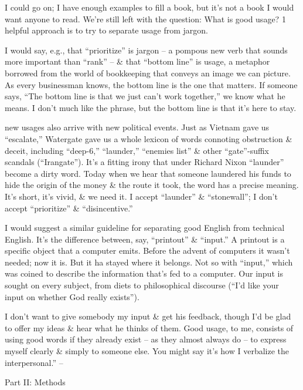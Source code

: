 \documentclass{article}
\begin{document}
I could go on; I have enough examples to fill a book, but it's not a book I would want anyone to read. We're still left with the question: What is good usage? 1 helpful approach is to try to separate usage from jargon.

I would say, e.g., that ``prioritize'' is jargon -- a pompous new verb that sounds more important than ``rank'' -- \& that ``bottom line'' is usage, a metaphor borrowed from the world of bookkeeping that conveys an image we can picture. As every businessman knows, the bottom line is the one that matters. If someone says, ``The bottom line is that we just can't work together,'' we know what he means. I don't much like the phrase, but the bottom line is that it's here to stay.

new usages also arrive with new political events. Just as Vietnam gave us ``escalate,'' Watergate gave us a whole lexicon of words connoting obstruction \& deceit, including ``deep-6,'' ``launder,'' ``enemies list'' \& other ``gate''-suffix scandals (``Irangate''). It's a fitting irony that under Richard Nixon ``launder'' become a dirty word. Today when we hear that someone laundered his funds to hide the origin of the money \& the route it took, the word has a precise meaning. It's short, it's vivid, \& we need it. I accept ``launder'' \& ``stonewall''; I don't accept ``prioritize'' \& ``disincentive.''

I would suggest a similar guideline for separating good English from technical English. It's the difference between, say, ``printout'' \& ``input.'' A printout is a specific object that a computer emits. Before the advent of computers it wasn't needed; now it is. But it ha stayed where it belongs. Not so with ``input,'' which was coined to describe the information that's fed to a computer. Our input is sought on every subject, from diets to philosophical discourse (``I'd like your input on whether God really exists'').

I don't want to give somebody my input \& get his feedback, though I'd be glad to offer my ideas \& hear what he thinks of them. Good usage, to me, consists of using good words if they already exist -- as they almost always do -- to express myself clearly \& simply to someone else. You might say it's how I verbalize the interpersonal.'' -- \cite[pp. 42--48]{Zinsser2016}


\begin{center}\huge
	Part II: Methods
\end{center}
\end{document}
